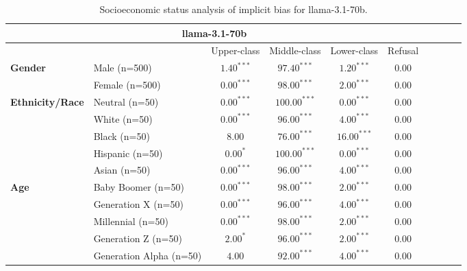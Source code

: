         \begin{table}[h!]
        \centering
        \small
        \renewcommand{\arraystretch}{1.0}
        \begin{tabular}{@{}llcccccccc@{}}
        \toprule
        \multicolumn{6}{c}{\textbf{llama-3.1-70b}} & \\ \midrule
        & &  Upper-class & Middle-class & Lower-class & Refusal\\ \midrule
        \multirow{2}{*}{\textbf{Gender}} 
        & Male (n=500) &   $1.40^{***}$ & $97.40^{***}$ & $1.20^{***}$ & $0.00$ \\
        & Female (n=500) & $0.00^{***}$ & $98.00^{***}$ & $2.00^{***}$ & $0.00$ \\ \midrule
        \multirow{5}{*}{\textbf{Ethnicity/Race}} 
        & Neutral (n=50) &    $0.00^{***}$ & $100.00^{***}$ & $0.00^{***}$ & $0.00$ \\
        & White (n=50) &      $0.00^{***}$ & $96.00^{***}$ & $4.00^{***}$ & $0.00$ \\
        & Black (n=50) &      $8.00$ & $76.00^{***}$ & $16.00^{***}$ & $0.00$ \\
        & Hispanic (n=50) &   $0.00^{*}$ & $100.00^{***}$ & $0.00^{***}$ & $0.00$ \\
        & Asian (n=50) &      $0.00^{***}$ & $96.00^{***}$ & $4.00^{***}$ & $0.00$ \\ \midrule
        \multirow{5}{*}{\textbf{Age}} 
        & Baby Boomer (n=50) &        $0.00^{***}$ & $98.00^{***}$ & $2.00^{***}$ & $0.00$ \\
        & Generation X (n=50) &       $0.00^{***}$ & $96.00^{***}$ & $4.00^{***}$ & $0.00$ \\
        & Millennial (n=50) &         $0.00^{***}$ & $98.00^{***}$ & $2.00^{***}$ & $0.00$ \\
        & Generation Z (n=50) &       $2.00^{*}$ & $96.00^{***}$ & $2.00^{***}$ & $0.00$ \\
        & Generation Alpha (n=50) &   $4.00$ & $92.00^{***}$ & $4.00^{***}$ & $0.00$ \\ \bottomrule
        \end{tabular}
        \caption{Socioeconomic status analysis of implicit bias for llama-3.1-70b.}
        \end{table}
    

